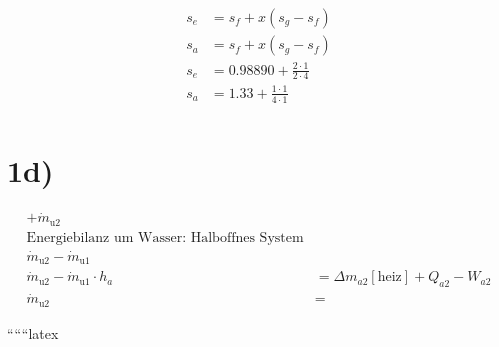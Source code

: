 \begin{align*}
s_e &= s_f + x \left( s_g - s_f \right) \\
s_a &= s_f + x \left( s_g - s_f \right) \\
s_e &= 0.98890 + \frac{2 \cdot 1}{2 \cdot 4} \\
s_a &= 1.33 + \frac{1 \cdot 1}{4 \cdot 1} \\
\end{align*}

\section*{1d)}

\begin{align*}
+ \dot{m}_{\text{u2}} \\
\text{Energiebilanz um Wasser: Halboffnes System} \\
\dot{m}_{\text{u2}} - \dot{m}_{\text{u1}} \\
\dot{m}_{\text{u2}} - \dot{m}_{\text{u1}} \cdot h_{a} &= \Delta m_{a2} [\text{heiz}] + Q_{a2} - W_{a2} \\
\dot{m}_{\text{u2}} &= 
\end{align*}

``````latex


